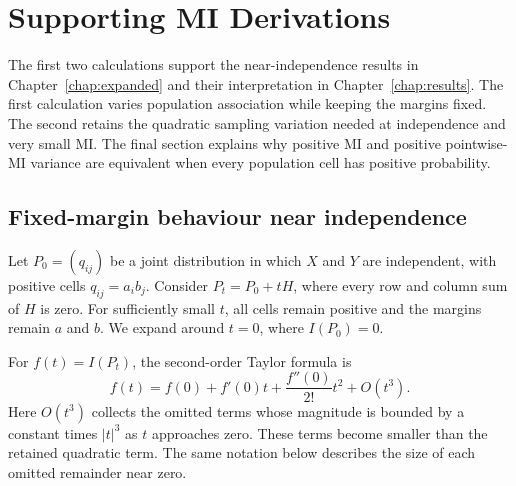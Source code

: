 \chapter{Supporting MI Derivations}
\label{app:derivation-details}

The first two calculations support the near-independence results in
Chapter~\ref{chap:expanded} and their interpretation in
Chapter~\ref{chap:results}. The first calculation varies population
association while keeping the margins fixed. The second retains the
quadratic sampling variation needed at independence and very small MI.
The final section explains why positive MI and positive pointwise-MI
variance are equivalent when every population cell has positive probability.

\begin{samepage}
\section{Fixed-margin behaviour near independence}
\label{sec:fixed-margin-local-derivation}

Let \(P_0=(q_{ij})\) be a joint distribution in which \(X\) and \(Y\)
are independent, with positive cells
\(q_{ij}=a_i b_j\). Consider \(P_t=P_0+tH\), where every row and column
sum of \(H\) is zero. For sufficiently small \(t\), all cells remain
positive and the margins remain \(a\) and \(b\). We expand around
\(t=0\), where \(I(P_0)=0\).
\par
\end{samepage}

For \(f(t)=I(P_t)\), the second-order Taylor formula is
\begin{equation}
 f(t)=f(0)+f'(0)t+\frac{f''(0)}{2!}t^2+O(t^3).
\end{equation}
Here \(O(t^3)\) collects the omitted terms whose magnitude is bounded by
a constant times \(|t|^3\) as \(t\) approaches zero. These terms become
smaller than the retained quadratic term. The same notation below describes
the size of each omitted remainder near zero.

